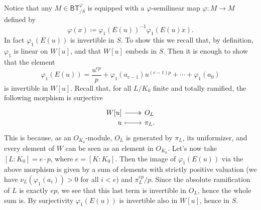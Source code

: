 \begin{rem}[]\label{invertibilityphi1E(u))}
	Notice that any $M \in \mathsf{BT}^{\varphi}_{/S}$ is equipped with a 
	$\varphi$-semilinear map $\varphi\colon M \to M$ defined by
	\begin{equation*}
		\varphi (x) \coloneqq \varphi_1 \left( E(u) \right)^{-1} \varphi_1 (E(u)x)
	.\end{equation*}
	In fact $\varphi_1(E(u))$ is invertible in $S$.
	To show this we recall that, by definition, $\varphi_1$ is
	linear on $W[u]$, and that $W[u]$ embeds in $S$.
	Then it is enough to show that the element
	\begin{equation*}
		\varphi_1(E(u)) =
		\frac{ u^{ep} }{ p } + \varphi_1(a_{e-1}) u^{(e-1)p} +
		\cdots + \varphi_1(a_0)
	\end{equation*}
	is invertible in $W[u]$.
	Recall that,
	for all $L/K_0$ finite and totally ramified,
	the following morphism is surjective 
	\begin{equation*}
	\begin{tikzcd}[row sep = 0ex
		,/tikz/column 1/.append style={anchor=base east}
		,/tikz/column 2/.append style={anchor=base west}]
		W[u] \arrow[r, "", twoheadrightarrow] &
		O_{L} \\
		u \arrow[r, "", mapsto] & 
		\pi_L
	.\end{tikzcd}
	\end{equation*} 
	This is because, as an $O_{K_0}$-module, $O_L$ is generated by $\pi_L$, its uniformizer,
	and every element of $W$ can be seen as an element in $O_{K_0}$.
	Let's now take $[ L : K_0 ] = e \cdot p$, where $e = [ K : K_0 ]$.
	Then the image of $\varphi_1(E(u))$ via the above morphism is given by a sum of
	elements with strictly positive valuation 
	(we have $\nu_L(\varphi_1(a_i)) > 0$ for all $i < e$) and $\pi_L^{ep}/p$.
	Since the absolute ramification of $L$ is exactly $ep$, we see that this
	last term is invertible in $O_L$, hence the whole sum is.
	By surjectivity $\varphi_1(E(u))$ is invertible also in $W[u]$,
	hence in $S$.
\end{rem}


